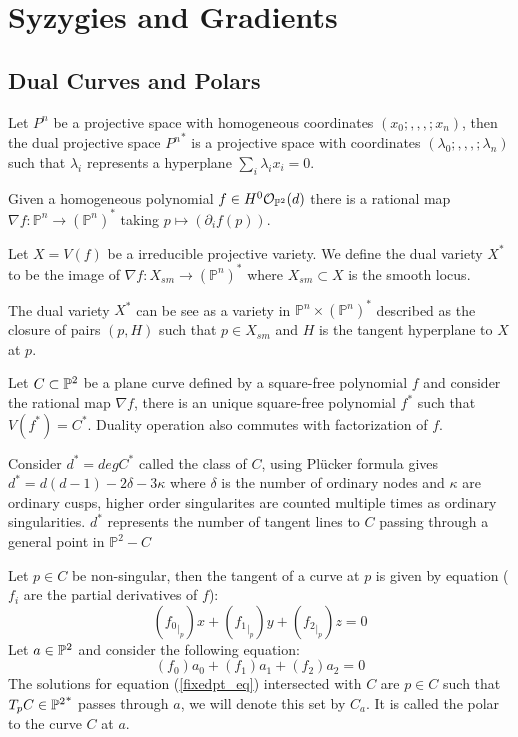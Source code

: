 \section{Syzygies and Gradients}
\subsection{Dual Curves and Polars}
\begin{definition}
Let $P^n$ be a projective space with homogeneous coordinates $(x_0;,,,;x_n)$, then the dual projective space ${P^n}^*$ is a projective space with coordinates $(\lambda_0;,,,;\lambda_n)$ such that $\lambda_i$ represents a hyperplane $\sum_i \lambda_i x_i = 0$.
\end{definition}
Given a homogeneous polynomial $f \in H^0 \mathcal{O}_{\mathbb{P}^2}(d)$ there is a rational map $\nabla f: \mathbb{P}^n \to (\mathbb{P}^n)^*$ taking $p \mapsto (\partial_i f(p))$.
\begin{definition}
Let $X = V(f)$ be a irreducible projective variety. We define the dual variety $X^*$ to be the image of $\nabla f:X_{sm} \to (\mathbb{P}^n)^*$ where $X_{sm} \subset X$ is the smooth locus.
\end{definition}
\begin{remark}
The dual variety $X^*$ can be see as a variety in $\mathbb{P}^n \times (\mathbb{P}^n)^*$ described as the closure of pairs $(p,H)$ such that $p \in X_{sm}$ and $H$ is the tangent hyperplane to $X$ at $p$.
\end{remark}
Let $C \subset {\mathbb{P}^2}$ be a plane curve defined by a square-free polynomial $f$ and consider the rational map $\nabla f$, there is an unique square-free polynomial $f^*$ such that $V(f^*) = C^*$. Duality operation also commutes with factorization of $f$.
\begin{definition}
Consider $d^* = deg C^*$ called the class of $C$, using Plücker formula gives $d^*=d(d-1)-2\delta-3\kappa$ where $\delta$ is the number of ordinary nodes and $\kappa$ are ordinary cusps, higher order singularites are counted multiple times as ordinary singularities.
$d^*$ represents the number of tangent lines to $C$ passing through a general point in $\mathbb{P}^2 - C$
\end{definition}

\begin{remark}
Let $p \in C$ be non-singular, then the tangent of a curve at $p$ is given by equation ($f_i$ are the partial derivatives of $f$):
\begin{equation}\label{tangent_eq}
({f_0}_{|_p}) x + ({f_1}_{|_p}) y + ({f_2}_{|_p}) z = 0
\end{equation}
Let $a \in {\mathbb{P}^2}$ and consider the following equation:
\begin{equation}\label{fixedpt_eq}
({f_0}) a_0 + ({f_1}) a_1 + ({f_2}) a_2 = 0
\end{equation}
The solutions for equation (\ref{fixedpt_eq}) intersected with $C$ are $p \in C$ such that $T_p C \in {\mathbb{P}^2}^*$ passes through $a$, we will denote this set by $C_a$. It is called the polar to the curve $C$ at $a$.
\end{remark}

